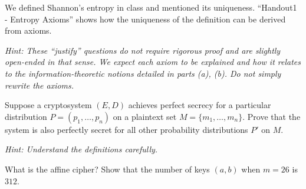 \documentclass[10pt]{exam}
\begin{document}
\begin{questions}


\question[8] We defined Shannon's entropy in class and mentioned its uniqueness. ``Handout1 - Entropy Axioms'' shows how the uniqueness of the definition can be derived from axioms. 


\textit{Hint: These ``justify'' questions do not require rigorous proof and are slightly open-ended in that sense. We expect each axiom to be explained and how it relates to the information-theoretic notions detailed in parts (a), (b). Do not simply rewrite the axioms.}

\begin{solution}

\end{solution}

\question[5] Suppose a cryptosystem $(E,D)$ achieves perfect secrecy for a particular distribution $P= (p_1,\ldots,p_n)$ on a plaintext set $M = \{m_1,\ldots,m_n\}$. Prove that the system is also perfectly secret for all other probability distributions $P'$ on $M$. 

\textit{Hint: Understand the definitions carefully.}

\question[5] What is the affine cipher? Show that the number of keys $(a,b)$ when $m=26$ is $312$.

\end{questions}
\end{document}
